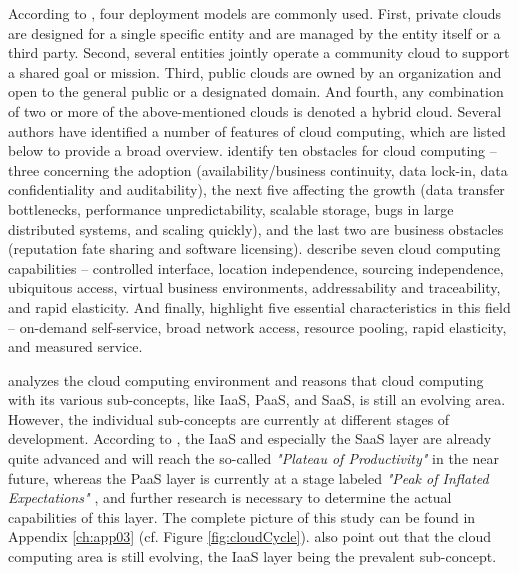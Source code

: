 According to \citet[p. 3]{Mell2011}, four deployment models are commonly used. First, private clouds are designed for a single specific entity and are managed by the entity itself or a third party. Second, several entities jointly operate a community cloud to support a shared goal or mission. Third, public clouds are owned by an organization and open to the general public or a designated domain. And fourth, any combination of two or more of the above-mentioned clouds is denoted a hybrid cloud.
Several authors have identified a number of features of cloud computing, which are listed below to provide a broad overview. \citet[pp. 54-58]{Armbrust2010} identify ten obstacles for cloud computing -- three concerning the adoption (availability/business continuity, data lock-in, data confidentiality and auditability), the next five affecting the growth (data transfer bottlenecks, performance unpredictability, scalable storage, bugs in large distributed systems, and scaling quickly), and the last two are business obstacles (reputation fate sharing and software licensing). \citet[pp. 120-127]{Iyer2010} describe seven cloud computing capabilities -- controlled interface, location independence, sourcing independence, ubiquitous access, virtual business environments, addressability and traceability, and rapid elasticity. And finally, \citet[p. 2]{Mell2011} highlight five essential characteristics in this field -- on-demand self-service, broad network access, resource pooling, rapid elasticity, and measured service. 

\citet{Smith2012} analyzes the cloud computing environment and reasons that cloud computing with its various sub-concepts, like \ac{IaaS}, \ac{PaaS}, and \ac{SaaS}, is still an evolving area. However, the individual sub-concepts are currently at different stages of development. According to \citet[p. 5]{Smith2012}, the \ac{IaaS} and especially the \ac{SaaS} layer are already quite advanced and will reach the so-called \textit{"Plateau of Productivity"} in the near future, whereas the \ac{PaaS} layer is currently at a stage labeled \textit{"Peak of Inflated Expectations"} \citep[p. 5]{Smith2012}, and further research is necessary to determine the actual capabilities of this layer. The complete picture of this study can be found in Appendix \ref{ch:app03} (cf. Figure \ref{fig:cloudCycle}). \citet[p. 120]{Iyer2010} also point out that the cloud computing area is still evolving, the \ac{IaaS} layer being the prevalent sub-concept.

